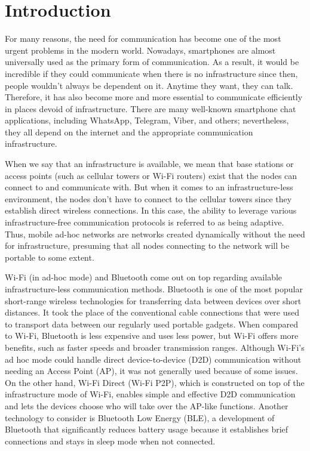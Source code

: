 \section{Introduction}

For many reasons, the need for communication has become one of the most urgent
problems in the modern world. Nowadays, smartphones are almost universally used
as the primary form of communication. As a result, it would be incredible if
they could communicate when there is no infrastructure since then, people
wouldn't always be dependent on it. Anytime they want, they can talk.
Therefore, it has also become more and more essential to communicate
efficiently in places devoid of infrastructure. There are many well-known
smartphone chat applications, including WhatsApp, Telegram, Viber, and others;
nevertheless, they all depend on the internet and the appropriate communication
infrastructure.

When we say that an infrastructure is available, we mean that base stations or
access points (such as cellular towers or Wi-Fi routers) exist that the nodes
can connect to and communicate with. But when it comes to an
infrastructure-less environment, the nodes don’t have to connect to the
cellular towers since they establish direct wireless connections. In this case,
the ability to leverage various infrastructure-free communication protocols is
referred to as being adaptive. Thus, mobile ad-hoc networks are networks
created dynamically without the need for infrastructure, presuming that all
nodes connecting to the network will be portable to some
extent\cite{chlamtac2003}.

Wi-Fi (in ad-hoc mode) and Bluetooth come out on top regarding available
infrastructure-less communication methods. Bluetooth is one of the most popular
short-range wireless technologies for transferring data between devices over
short distances. It took the place of the conventional cable connections that
were used to transport data between our regularly used portable gadgets. When
compared to Wi-Fi, Bluetooth is less expensive and uses less power, but Wi-Fi
offers more benefits, such as faster speeds and broader transmission ranges.
Although Wi-Fi's ad hoc mode could handle direct device-to-device (D2D)
communication without needing an Access Point (AP), it was not generally used
because of some issues. On the other hand, Wi-Fi Direct (Wi-Fi P2P), which is
constructed on top of the infrastructure mode of Wi-Fi, enables simple and
effective D2D communication and lets the devices choose who will take over the
AP-like functions. Another technology to consider is Bluetooth Low Energy
(BLE), a development of Bluetooth that significantly reduces battery usage
because it establishes brief connections and stays in sleep mode when not
connected.

